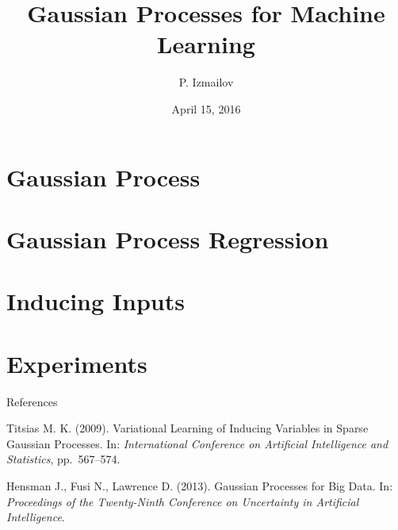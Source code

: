 \documentclass{beamer}
\title{Gaussian Processes for Machine Learning}
\author{P. Izmailov}
\date{April 15, 2016}
\begin{document}
	\begin{frame}
		\maketitle
	\end{frame}
	\section{Gaussian Process}
		
	\section{Gaussian Process Regression}
		
	\section{Inducing Inputs}
		
	\section{Experiments}
		
	\begin{frame}{References}
		\begin{thebibliography}{99}

			Titsias M. K. (2009).  Variational Learning of Inducing Variables in Sparse Gaussian
			Processes.  In: {\it International Conference on Artificial Intelligence and Statistics}, pp.~567–574.

			Hensman J., Fusi N., Lawrence D. (2013).  Gaussian Processes for Big Data.  In: {\it Proceedings of the Twenty-Ninth Conference on Uncertainty in Artificial Intelligence}.

		\end{thebibliography}	
	\end{frame}
\end{document}

